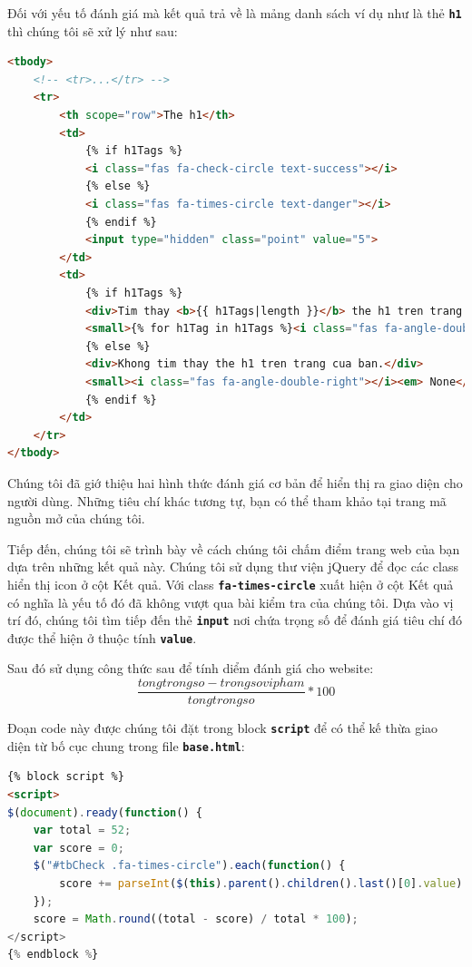 \par
Đối với yếu tố đánh giá mà kết quả trả về là mảng danh sách ví dụ như là thẻ \textbf{\texttt{h1}} thì chúng tôi sẽ xử lý như sau:
\begin{lstlisting}[language=html]
<tbody>
    <!-- <tr>...</tr> -->
    <tr>
        <th scope="row">The h1</th>
        <td>
            {% if h1Tags %}
            <i class="fas fa-check-circle text-success"></i>
            {% else %}
            <i class="fas fa-times-circle text-danger"></i>
            {% endif %}
            <input type="hidden" class="point" value="5">
        </td>
        <td>
            {% if h1Tags %}
            <div>Tim thay <b>{{ h1Tags|length }}</b> the h1 tren trang cua ban.</div>
            <small>{% for h1Tag in h1Tags %}<i class="fas fa-angle-double-right"></i> {{ h1Tag }}<br>{% endfor %}</small>
            {% else %}
            <div>Khong tim thay the h1 tren trang cua ban.</div>
            <small><i class="fas fa-angle-double-right"></i><em> None</em></small>
            {% endif %}
        </td>
    </tr>
</tbody>
\end{lstlisting}
\par
Chúng tôi đã giớ thiệu hai hình thức đánh giá cơ bản để hiển thị ra giao diện cho người dùng. Những tiêu chí khác tương tự, bạn có thể tham khảo tại trang mã nguồn mở của chúng tôi.
\par
Tiếp đến, chúng tôi sẽ trình bày về cách chúng tôi chấm điểm trang web của bạn dựa trên những kết quả này. Chúng tôi sử dụng thư viện jQuery để đọc các class hiển thị icon ở cột Kết quả. Với class \textbf{\texttt{fa-times-circle}} xuất hiện ở cột Kết quả có nghĩa là yếu tố đó đã không vượt qua bài kiểm tra của chúng tôi. Dựa vào vị trí đó, chúng tôi tìm tiếp đến thẻ \textbf{\texttt{input}} nơi chứa trọng số để đánh giá tiêu chí đó được thể hiện ở thuộc tính \textbf{\texttt{value}}.
\par
Sau đó sử dụng công thức sau để tính diểm đánh giá cho website: \[\displaystyle\frac{tongtrongso - trongsovipham}{tongtrongso}*100\]
\par
Đoạn code này được chúng tôi đặt trong block \textbf{\texttt{script}} để có thể kế thừa giao diện từ bố cục chung trong file \textbf{\texttt{base.html}}:
\begin{lstlisting}[language=html]
{% block script %}
<script>
$(document).ready(function() {
    var total = 52;
    var score = 0;
    $("#tbCheck .fa-times-circle").each(function() {
        score += parseInt($(this).parent().children().last()[0].value)
    });
    score = Math.round((total - score) / total * 100);
</script>
{% endblock %}
\end{lstlisting}
